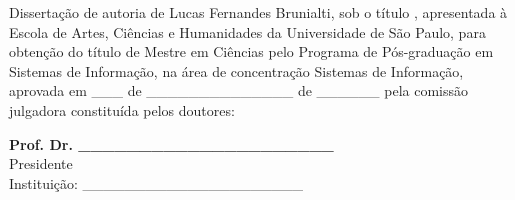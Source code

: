 \documentclass[
    12pt,                %
    oneside,            %
    a4paper,            %
    english,            %
    brazil                %
    ]{abntex2ppgsi}
\begin{document}

\begin{folhadeaprovacao}
%
%
%
%
\noindent Dissertação de autoria de Lucas Fernandes Brunialti, sob o título \textbf{\imprimirtitulo}, apresentada à Escola de Artes, Ciências e Humanidades da Universidade de São Paulo, para obtenção do título de Mestre em Ciências pelo Programa de Pós-graduação em Sistemas de Informação, na área de concentração Sistemas de Informação, aprovada em \_\_\_ de \_\_\_\_\_\_\_\_\_\_\_\_\_\_ de \_\_\_\_\_\_ pela comissão julgadora constituída pelos doutores:

\vspace*{3cm}

\begin{center}
%
%
%
%
%
%
%
%
%
\textbf{Prof. Dr. \_\_\_\_\_\_\_\_\_\_\_\_\_\_\_\_\_\_\_\_\_}
\\ Presidente
\\ Instituição: \_\_\_\_\_\_\_\_\_\_\_\_\_\_\_\_\_\_\_\_\_


\end{center}
\end{folhadeaprovacao}
\end{document}
